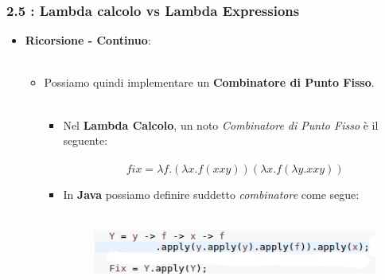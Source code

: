 \begin{frame}
	\frametitle{\textbf{2.5 : Lambda calcolo vs Lambda Expressions}}
	\begin{itemize}
		\item
			\textbf{Ricorsione - Continuo}:\\\
			\begin{itemize}
				\item 
					Possiamo quindi implementare un \textbf{Combinatore di Punto Fisso}.\\\
				\begin{itemize}
					\item
						Nel \textbf{Lambda Calcolo}, un noto \textit{Combinatore di Punto Fisso} è il seguente:\\\
							\[
								fix = \lambda f.(\lambda x.f(xxy))(\lambda x.f(\lambda y.xxy))
							\]
					\item
						In \textbf{Java} possiamo definire suddetto \textit{combinatore} come segue:\\\
							\begin{figure}
								\centering
								\includegraphics[width=0.8\linewidth]{image/fix.png}
								\label{fig:identity}
							\end{figure}
				\end{itemize}
			\end{itemize}
	\end{itemize}
\end{frame}


